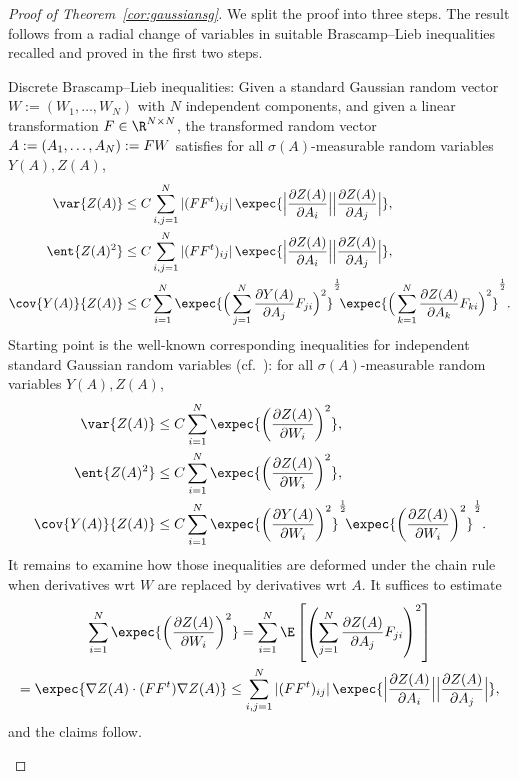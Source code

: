 \begin{proof}[Proof of Theorem~\ref{cor:gaussiansg}]
We split the proof into three steps. The result follows from a radial change of variables in suitable Brascamp--Lieb inequalities recalled and proved in the first two steps.


\setcounter{stepcount}{0}
\begin{step}{Discrete Brascamp--Lieb inequalities:}\label{step1prooftheo3.1}
Given a standard Gaussian random vector $W:=(W_1,\ldots,W_N)$ with $N$ independent components, and given a linear transformation $F\in\R^{N\times N}$, the transformed random vector $A:=(A_1,\ldots,A_N)\linebreak:=FW$ satisfies for all $\sigma(A)$-measurable random variables $Y(A),Z(A)$,
\begin{equation}\label{eq:bl-var-disr}
\begin{aligned}
\var{Z(A)} &\le C\sum_{i,j=1}^N|(FF^t)_{ij}|\,\expec{\Big|\frac{\partial Z(A)}{\partial A_i}\Big|\Big|\frac{\partial Z(A)}{\partial A_j}\Big|},
\\
\ent{Z(A)^2} &\le C\sum_{i,j=1}^N|(FF^t)_{ij}|\,\expec{\Big|\frac{\partial Z(A)}{\partial A_i}\Big|\Big|\frac{\partial Z(A)}{\partial A_j}\Big|},\\
\cov{Y(A)}{Z(A)} &\le  C\sum_{i=1}^N\expec{\Big(\sum_{j=1}^N\frac{\partial{Y(A)}}{\partial A_j}F_{ji}\Big)^2}^\frac12\!\expec{\Big(\sum_{k=1}^N\frac{\partial{Z(A)}}{\partial A_k}F_{ki}\Big)^2}^\frac12.
\end{aligned}
\end{equation}
Starting point is the well-known corresponding inequalities for independent standard Gaussian random variables (cf.~\cite{Gross-75}): for all $\sigma(A)$-measurable random variables $Y(A),Z(A)$,
\begin{align*}
\var{Z(A)} &\le C\sum_{i=1}^N\expec{\left(\frac{\partial Z(A)}{\partial W_i}\right)^2},
\\
\ent{Z(A)^2} &\le C\sum_{i=1}^N\expec{\left(\frac{\partial Z(A)}{\partial W_i}\right)^2},
\\
\cov{Y(A)}{Z(A)} &\le C\sum_{i=1}^N\expec{\left(\frac{\partial{Y(A)}}{\partial W_i}\right)^2}^\frac12\!\expec{\left(\frac{\partial{Z(A)}}{\partial W_i}\right)^2}^\frac12.
\end{align*}
It remains to examine how those inequalities are deformed under the chain rule when derivatives wrt $W$ are replaced by derivatives wrt $A$. It suffices to estimate
\begin{multline*}
\sum_{i=1}^N\expec{\left(\frac{\partial{Z(A)}}{\partial W_i}\right)^2} = \sum_{i=1}^N\E\left[{\left(\sum_{j=1}^N\frac{\partial{Z(A)}}{\partial A_j}F_{ji} \right)^2}\right]\\
=\expec{\nabla Z(A)\cdot (FF^t)\nabla Z(A)} 
\le \sum_{i,j=1}^N|(FF^t)_{ij}|\,\expec{\Big|\frac{\partial{Z(A)}}{\partial A_i}\Big|\Big|\frac{\partial{Z(A)}}{\partial A_j}\Big|},
\end{multline*}
and the claims follow.
\end{step}


\end{proof}
